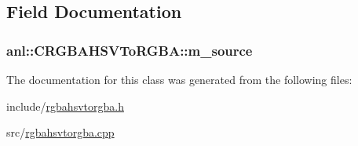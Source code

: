 \subsection{Field Documentation}
\hypertarget{classanl_1_1CRGBAHSVToRGBA_aa732e8841a8e1e4cf8d4bbb01ae10ba2}{
\subsubsection[{m\_\-source}]{ {\bf anl::CRGBAHSVToRGBA::m\_\-source}}}
\label{classanl_1_1CRGBAHSVToRGBA_aa732e8841a8e1e4cf8d4bbb01ae10ba2}


The documentation for this class was generated from the following files:\begin{DoxyCompactItemize}
\item 
include/\hyperlink{rgbahsvtorgba_8h}{rgbahsvtorgba.h}\item 
src/\hyperlink{rgbahsvtorgba_8cpp}{rgbahsvtorgba.cpp}\end{DoxyCompactItemize}
